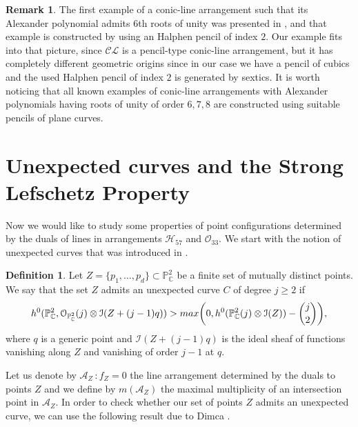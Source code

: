 \documentclass[11pt]{article}
\theoremstyle{plain}
\theoremstyle{definition}
\newtheorem{definition}[thm]{Definition}
\newtheorem{remark}[thm]{Remark}
\theoremstyle{plain}
\renewcommand\geq{\geqslant}
\begin{document}
\begin{remark}
The first example of a conic-line arrangement such that its Alexander polynomial admits $6$th roots of unity was presented in \cite{DPS}, and that example is constructed by using an Halphen pencil of index $2$. Our example fits into that picture, since $\mathcal{CL}$ is a pencil-type conic-line arrangement, but it has completely different geometric origins since in our case we have a pencil of cubics and the used Halphen pencil of index $2$ is generated by sextics. It is worth noticing that all known examples of conic-line arrangements with Alexander polynomials having roots of unity of order $6,7,8$ are constructed using suitable pencils of plane curves.
\end{remark}

\section{Unexpected curves and the Strong Lefschetz Property}
Now we would like to study some properties of point configurations determined by the duals of lines in arrangements $\mathcal{H}_{57}$ and $\mathcal{O}_{33}$. We start with the notion of unexpected curves that was introduced in \cite{Cook}.
\begin{definition}
Let $Z = \{p_{1}, \ldots, p_{d}\} \subset \mathbb{P}^{2}_{\mathbb{C}}$ be a finite set of mutually distinct points. We say that the set $Z$ admits an unexpected curve $C$ of degree $j\geq 2$ if
$$h^{0}(\mathbb{P}^{2}_{\mathbb{C}}, \mathcal{O}_{\mathbb{P}^{2}_{\mathbb{C}}}(j) \otimes \mathcal{I}(Z + (j-1)q)) > {\rm max} \bigg( 0, h^{0}(\mathbb{P}^{2}_{\mathbb{C}}(j) \otimes \mathcal{I}(Z))-\binom{j}{2}\bigg),$$
where $q$ is a generic point and $\mathcal{I}(Z + (j-1)q)$ is the ideal sheaf of functions vanishing along $Z$ and vanishing of order $j-1$ at $q$.
\end{definition}
Let us denote by $\mathcal{A}_{Z} \, : f_{Z}=0$ the line arrangement determined by the duals to points $Z$ and we define by $m(\mathcal{A}_{Z})$ the maximal multiplicity of an intersection point in $\mathcal{A}_{Z}$. In order to check whether our set of points $Z$ admits an unexpected curve, we can use the following result due to Dimca \cite{unexp}.
\end{document}
